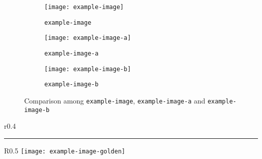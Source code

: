 \documentclass[12pt]{article}
\begin{document}
\begin{figure}[htb]
     \centering
     \begin{subfigure}[t]{0.3\textwidth}
         \centering
         \texttt{[image: example-image]}
         \cprotect\caption{\verb|example-image|}
         \label{fig:example}
     \end{subfigure}
     \hfill
     \begin{subfigure}[t]{0.3\textwidth}
         \centering
         \texttt{[image: example-image-a]}
         \cprotect\caption{\verb|example-image-a|}
         \label{fig:a}
     \end{subfigure}
     \hfill
     \begin{subfigure}[t]{0.3\textwidth}
         \centering
         \texttt{[image: example-image-b]}
         \cprotect\caption{\verb|example-image-b|}
         \label{fig:b}
     \end{subfigure}
        \cprotect\caption{Comparison among \verb|example-image|, \verb|example-image-a| and \verb|example-image-b|}
        \label{fig:three graphs}
\end{figure}

\lipsum[3]

\begin{wrapfigure}{r}{0.4\textwidth}                 %
        \centering
        \rule{4cm}{6cm}
        \cprotect\caption{Wraped figure using \verb|\begin{wrapfigure}|}           %
\end{wrapfigure}

\blindtext

\begin{wrapfigure}{R}{0.5\textwidth}
        \centering
        \texttt{[image: example-image-golden]}
        \caption{Image of Golden Ratio}
\end{wrapfigure}

\lipsum[1-3]



\end{document}
